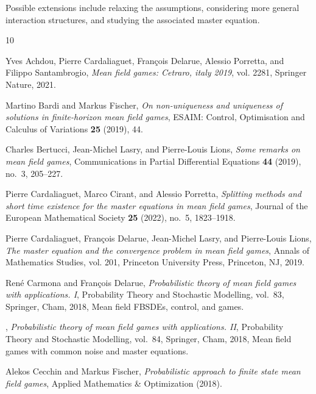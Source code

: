 \documentclass[11pt,a4paper]{amsart}
\theoremstyle{definition}
\begin{document}
Possible extensions include relaxing the assumptions, considering more general interaction structures, and studying the associated master equation.

%
%

\begin{thebibliography}{10}
	
	Yves Achdou, Pierre Cardaliaguet, Fran{\c{c}}ois Delarue, Alessio Porretta, and
	Filippo Santambrogio, \emph{Mean field games: Cetraro, italy 2019}, vol.
	2281, Springer Nature, 2021.
	
	Martino Bardi and Markus Fischer, \emph{On non-uniqueness and uniqueness of
		solutions in finite-horizon mean field games}, ESAIM: Control, Optimisation
	and Calculus of Variations \textbf{25} (2019), 44.
	
	Charles Bertucci, Jean-Michel Lasry, and Pierre-Louis Lions, \emph{Some remarks
		on mean field games}, Communications in Partial Differential Equations
	\textbf{44} (2019), no.~3, 205--227.
	
	Pierre Cardaliaguet, Marco Cirant, and Alessio Porretta, \emph{Splitting
		methods and short time existence for the master equations in mean field
		games}, Journal of the European Mathematical Society \textbf{25} (2022),
	no.~5, 1823--1918.
	
	Pierre Cardaliaguet, Fran\c{c}ois Delarue, Jean-Michel Lasry, and Pierre-Louis
	Lions, \emph{The master equation and the convergence problem in mean field
		games}, Annals of Mathematics Studies, vol. 201, Princeton University Press,
	Princeton, NJ, 2019. 
	
	Ren\'{e} Carmona and Fran\c{c}ois Delarue, \emph{Probabilistic theory of mean
		field games with applications. {I}}, Probability Theory and Stochastic
	Modelling, vol.~83, Springer, Cham, 2018, Mean field FBSDEs, control, and
	games. 
	
	\bysame, \emph{Probabilistic theory of mean field games with applications.
		{II}}, Probability Theory and Stochastic Modelling, vol.~84, Springer, Cham,
	2018, Mean field games with common noise and master equations. 
	
	Alekos Cecchin and Markus Fischer, \emph{Probabilistic approach to finite state
		mean field games}, Applied Mathematics {\&} Optimization (2018).
	

\end{thebibliography}
\end{document}
